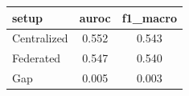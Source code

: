 \begin{tabular*}{\linewidth}{@{\extracolsep{\fill}}lcc@{}}
\toprule
setup & auroc & f1\_macro \\
\midrule
Centralized & 0.552 & 0.543 \\
Federated & 0.547 & 0.540 \\
Gap & 0.005 & 0.003 \\
\bottomrule
\end{tabular*}

